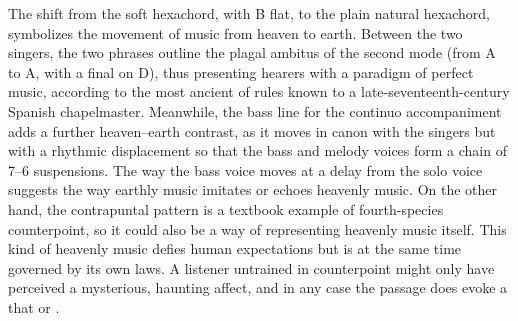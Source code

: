 
The shift from the  soft hexachord, with B flat, to the plain
natural hexachord, symbolizes the movement of music from heaven to earth.
Between the two singers, the two phrases outline the plagal ambitus of the
second mode (from A to A, with a final on D), thus presenting hearers with a
paradigm of perfect music, according to the most ancient of rules known to a
late-seventeenth-century Spanish chapelmaster.
Meanwhile, the bass line for the continuo accompaniment adds a further
heaven--earth contrast, as it moves in canon with the singers but with a
rhythmic displacement so that the bass and melody voices form a chain of 7--6
suspensions.
The way the bass voice moves at a delay from the solo voice suggests the way
earthly music imitates or echoes heavenly music.
On the other hand, the contrapuntal pattern is a textbook example of
fourth-species counterpoint, so it could also be a way of representing heavenly
music itself.  
This kind of heavenly music defies human expectations but is at the same time
governed by its own laws.
A listener untrained in counterpoint might only have perceived a mysterious,
haunting affect, and in any case the passage does evoke a  that  or .

